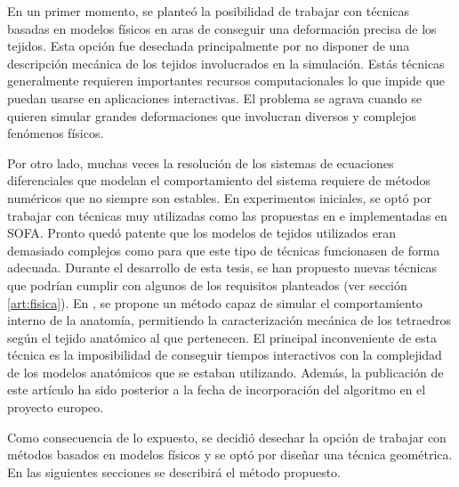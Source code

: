 En un primer momento, se planteó la posibilidad de trabajar con técnicas basadas en modelos físicos en aras de conseguir una deformación precisa de los tejidos. Esta opción fue desechada principalmente por no disponer de una descripción mecánica de los tejidos involucrados en la simulación. Estás técnicas generalmente requieren importantes recursos computacionales lo que impide que puedan usarse en aplicaciones interactivas. El problema se agrava cuando se quieren simular grandes deformaciones que involucran diversos y complejos fenómenos físicos.

Por otro lado, muchas veces la resolución de los sistemas de ecuaciones diferenciales que modelan el comportamiento del sistema requiere de métodos numéricos que no siempre son estables. En experimentos iniciales, se optó por trabajar con técnicas muy utilizadas como las propuestas en  \cite{Muller2004} e implementadas en \ac{SOFA}. Pronto quedó patente que los modelos de tejidos utilizados eran demasiado complejos como para que este tipo de técnicas funcionasen de forma adecuada.
Durante el desarrollo de esta tesis, se han propuesto nuevas técnicas que podrían cumplir con algunos de los requisitos planteados (ver sección \ref{art:fisica}). En \cite{abu2015position}, se propone un método capaz de simular el comportamiento interno de la anatomía, permitiendo la caracterización mecánica de los tetraedros según el tejido anatómico al que pertenecen.  
El principal inconveniente de esta técnica es la imposibilidad de conseguir tiempos interactivos con la complejidad de los modelos anatómicos que se estaban utilizando. Además, la publicación de este artículo ha sido posterior a la fecha de incorporación del algoritmo en el proyecto europeo.

Como consecuencia de lo expuesto, se decidió desechar la opción de trabajar con métodos basados en modelos físicos y se optó por diseñar una técnica geométrica. En las siguientes secciones se describirá el método propuesto.